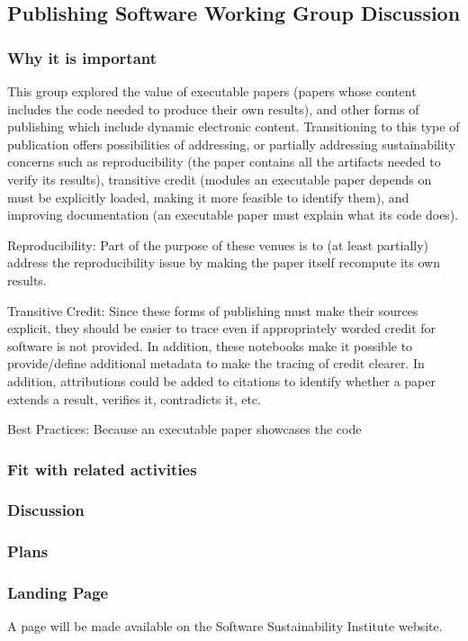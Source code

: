 \subsection{Publishing Software Working Group Discussion}

\subsubsection{Why it is important}

This group explored the value of executable papers (papers whose content includes
the code needed to produce their own results), and other forms of publishing which
include dynamic electronic content. Transitioning to this type of publication offers
possibilities of addressing, or partially addressing sustainability concerns 
such as reproducibility (the paper contains all the artifacts needed to verify its
results), transitive credit (modules an executable paper depends on must be explicitly
loaded, making it more feasible to identify them), and improving documentation (an executable
paper must explain what its code does).

Reproducibility: Part of the purpose of these venues is to (at least partially)
address the reproducibility issue by making the paper itself recompute its own
results.

Transitive Credit: Since these forms of publishing must make their sources explicit,
they should be easier to trace even if appropriately worded credit for software
is not provided. In addition, these notebooks make it possible to provide/define
additional metadata to make the tracing of credit clearer. In addition, attributions
could be added to citations to identify whether a paper extends a result, verifies it,
contradicts it, etc.

Best Practices: Because an executable paper showcases the code 

\subsubsection{Fit with related activities}

\subsubsection{Discussion}

\subsubsection{Plans}

\subsubsection{Landing Page}

A page will be made available on the Software Sustainability Institute website.
